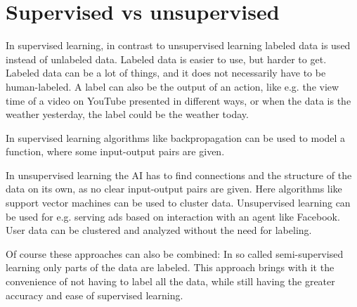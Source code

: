 \section{Supervised vs unsupervised}
In supervised learning, in contrast to unsupervised learning labeled data is used instead of unlabeled data. 
Labeled data is easier to use, but harder to get. Labeled data can be a lot of things, and it does not necessarily have to be human-labeled. A label can also be the output of an action, like e.g. the view time of a video on YouTube presented in different ways, or when the data is the weather yesterday, the label could be the weather today.

In supervised learning algorithms like backpropagation can be used to model a function, where some input-output pairs are given.

In unsupervised learning the AI has to find connections and the structure of the data on its own, as no clear input-output pairs are given.
Here algorithms like support vector machines can be used to cluster data. Unsupervised learning can be used for e.g. serving ads based on interaction with an agent like Facebook. User data can be clustered and analyzed without the need for labeling.

Of course these approaches can also be combined: In so called semi-supervised learning only parts of the data are labeled. This approach brings with it the convenience of not having to label all the data, while still having the greater accuracy and ease of supervised learning.
